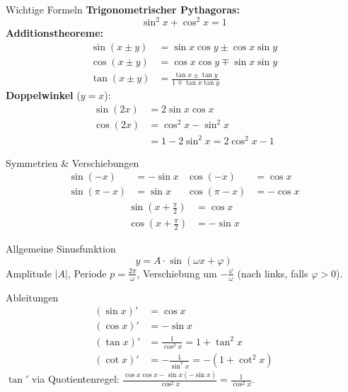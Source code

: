 \documentclass[a4paper, fontsize=7pt]{scrartcl}
\begin{document}
\begin{mainbox}{Wichtige Formeln}
\textbf{Trigonometrischer Pythagoras:}
$$\boxed{\sin^2 x + \cos^2 x = 1}$$
\textbf{Additionstheoreme:}
\begin{align*}
\sin(x \pm y) &= \sin x \cos y \pm \cos x \sin y \\
\cos(x \pm y) &= \cos x \cos y \mp \sin x \sin y \\
\tan(x \pm y) &= \frac{\tan x \pm \tan y}{1 \mp \tan x \tan y}
\end{align*}
\textbf{Doppelwinkel} ($y = x$):
\begin{align*}
\sin(2x) &= 2 \sin x \cos x \\
\cos(2x) &= \cos^2 x - \sin^2 x \\
         &= 1 - 2\sin^2 x = 2\cos^2 x - 1
\end{align*}
\end{mainbox}

\begin{subbox}{Symmetrien \& Verschiebungen}
\begin{align*}
\sin(-x) &= -\sin x & \cos(-x) &= \cos x \\
\sin(\pi - x) &= \sin x & \cos(\pi - x) &= -\cos x
\end{align*}
\begin{align*}
\sin\!\left(x + \tfrac{\pi}{2}\right) &= \cos x \\
\cos\!\left(x + \tfrac{\pi}{2}\right) &= -\sin x
\end{align*}
\end{subbox}

\begin{subbox}{Allgemeine Sinusfunktion}
$$y = A \cdot \sin(\omega x + \varphi)$$
Amplitude $|A|$, Periode $p = \frac{2\pi}{\omega}$, Verschiebung um
$-\frac{\varphi}{\omega}$ (nach links, falls $\varphi > 0$).
\end{subbox}

\begin{mainbox}{Ableitungen}
\begin{align*}
(\sin x)' &= \cos x \\
(\cos x)' &= -\sin x \\
(\tan x)' &= \frac{1}{\cos^2 x} = 1 + \tan^2 x \\
(\cot x)' &= -\frac{1}{\sin^2 x} = -(1 + \cot^2 x)
\end{align*}
$\tan'$ via Quotientenregel: $\frac{\cos x \cos x - \sin x (-\sin x)}{\cos^2 x}
= \frac{1}{\cos^2 x}$.
\end{mainbox}
\end{document}
